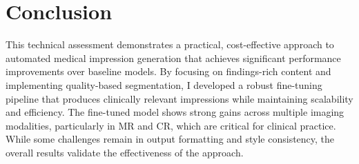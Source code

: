 \documentclass[11pt,letterpaper]{article}
\begin{document}
\section{Conclusion}

This technical assessment demonstrates a practical, cost-effective approach to automated medical impression generation that achieves significant performance improvements over baseline models. By focusing on findings-rich content and implementing quality-based segmentation, I developed a robust fine-tuning pipeline that produces clinically relevant impressions while maintaining scalability and efficiency. The fine-tuned model shows strong gains across multiple imaging modalities, particularly in MR and CR, which are critical for clinical practice. While some challenges remain in output formatting and style consistency, the overall results validate the effectiveness of the approach.
\end{document}
